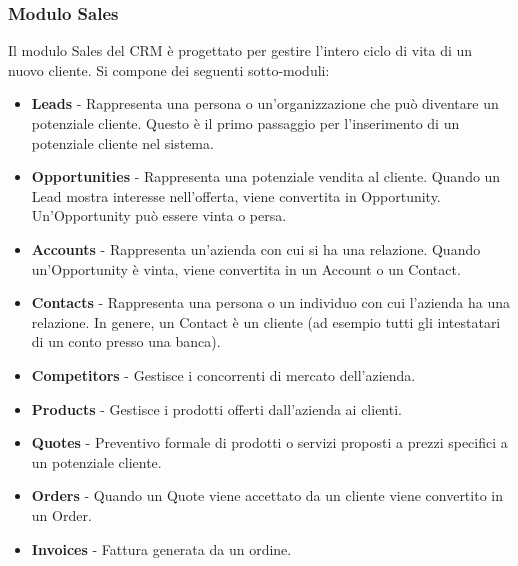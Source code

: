 \subsubsection{Modulo Sales}
Il modulo Sales del CRM è progettato per gestire l'intero ciclo di vita di un nuovo cliente. Si compone dei seguenti sotto-moduli:
\begin{itemize}
  \item \textbf{Leads} - Rappresenta una persona o un'organizzazione che può diventare un potenziale cliente. Questo è il primo passaggio per l'inserimento di un potenziale cliente nel sistema.
  \item \textbf{Opportunities} - Rappresenta una potenziale vendita al cliente. Quando un Lead mostra interesse nell'offerta, viene convertita in Opportunity. Un'Opportunity può essere vinta o persa.
  \item \textbf{Accounts} - Rappresenta un'azienda con cui si ha una relazione. Quando un'Opportunity è vinta, viene convertita in un Account o un Contact.
  \item \textbf{Contacts} - Rappresenta una persona o un individuo con cui l'azienda ha una relazione. In genere, un Contact è un cliente (ad esempio tutti gli intestatari di un conto presso una banca).
  \item \textbf{Competitors} - Gestisce i concorrenti di mercato dell'azienda.
  \item \textbf{Products} - Gestisce i prodotti offerti dall'azienda ai clienti.
  \item \textbf{Quotes} - Preventivo formale di prodotti o servizi proposti a prezzi specifici a un potenziale cliente.
  \item \textbf{Orders} - Quando un Quote viene accettato da un cliente viene convertito in un Order.
  \item \textbf{Invoices} - Fattura generata da un ordine.
\end{itemize}

